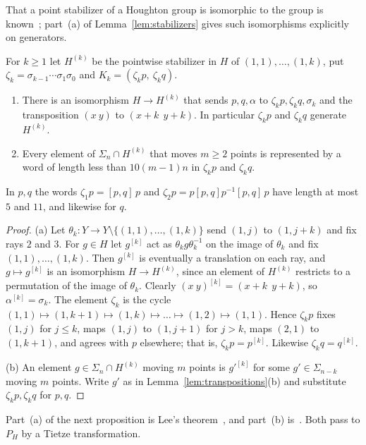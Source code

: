 That a point stabilizer of a Houghton group is isomorphic to the group is known~\cite[Example~3.6]{Cornulier2006}; part~(a) of
Lemma~\ref{lem:stabilizers} gives such isomorphisms explicitly on generators.

\begin{lemma}\label{lem:stabilizers}
For $k\ge1$ let $H^{(k)}$ be the pointwise stabilizer in $H$ of $(1,1),\dots,(1,k)$, put $\zeta_k=\sigma_{k-1}\cdots\sigma_1\sigma_0$ and
$K_k=(\zeta_kp,\ \zeta_kq)$.
\begin{enumerate}[label=(\alph*),itemsep=1pt]
\item There is an isomorphism $H\to H^{(k)}$ that sends $p,q,\alpha$ to $\zeta_kp,\zeta_kq,\sigma_k$ and the transposition $(x\ y)$ to
$(x{+}k\ \ y{+}k)$. In particular $\zeta_kp$ and $\zeta_kq$ generate $H^{(k)}$.
\item Every element of $\Sigma_n\cap H^{(k)}$ that moves $m\ge2$ points is represented by a word of length less than $10(m-1)n$ in $\zeta_kp$ and
$\zeta_kq$.
\end{enumerate}
In $p,q$ the words $\zeta_1p=[p,q]\,p$ and $\zeta_2p=p[p,q]p^{-1}[p,q]\,p$ have length at most $5$ and $11$, and likewise for $q$.
\end{lemma}

\begin{proof}
(a) Let $\theta_k:Y\to Y\setminus\{(1,1),\dots,(1,k)\}$ send $(1,j)$ to $(1,j+k)$ and fix rays $2$ and $3$. For $g\in H$ let $g^{[k]}$ act as
$\theta_kg\theta_k^{-1}$ on the image of $\theta_k$ and fix $(1,1),\dots,(1,k)$. Then $g^{[k]}$ is eventually a translation on each ray, and
$g\mapsto g^{[k]}$ is an isomorphism $H\to H^{(k)}$, since an element of $H^{(k)}$ restricts to a permutation of the image of $\theta_k$. Clearly
$(x\ y)^{[k]}=(x{+}k\ \ y{+}k)$, so $\alpha^{[k]}=\sigma_k$. The element $\zeta_k$ is the cycle $(1,1)\mapsto(1,k+1)\mapsto(1,k)\mapsto\dots\mapsto(1,2)\mapsto(1,1)$.
Hence $\zeta_kp$ fixes $(1,j)$ for $j\le k$, maps $(1,j)$ to $(1,j+1)$ for $j>k$, maps $(2,1)$ to $(1,k+1)$, and agrees with $p$ elsewhere; that is,
$\zeta_kp=p^{[k]}$. Likewise $\zeta_kq=q^{[k]}$.

(b) An element $g\in\Sigma_n\cap H^{(k)}$ moving $m$ points is $g'^{[k]}$ for some $g'\in\Sigma_{n-k}$ moving $m$ points. Write $g'$ as in
Lemma~\ref{lem:transpositions}(b) and substitute $\zeta_kp,\zeta_kq$ for $p,q$.
\end{proof}

Part~(a) of the next proposition is Lee's theorem~\cite[Theorem~D]{Lee2012}, and part~(b) is~\cite[Theorems~3.2 and~3.3]{DouglasMghirbiA}. Both
pass to $P_H$ by a Tietze transformation.


